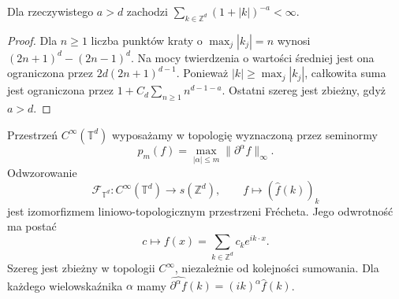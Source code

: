 \begin{lemat}
\label{lem:dt-lattice-summability}
Dla rzeczywistego $a>d$ zachodzi
$\sum_{k\in\mathbb Z^d}(1+|k|)^{-a}<\infty$.
\end{lemat}
\begin{proof}
Dla $n\ge1$ liczba punktów kraty o
$\max_j|k_j|=n$ wynosi
$(2n+1)^d-(2n-1)^d$.
Na mocy twierdzenia o wartości średniej
jest ona ograniczona przez $2d(2n+1)^{d-1}$.
Ponieważ $|k|\ge\max_j|k_j|$, całkowita
suma jest ograniczona przez
$1+C_d\sum_{n\ge1}n^{d-1-a}$.
Ostatni szereg jest zbieżny, gdyż $a>d$.
\end{proof}

\begin{twierdzenie}
\label{thm:dt-smooth-torus-fourier}
Przestrzeń $C^\infty(\mathbb T^d)$ wyposażamy
w topologię wyznaczoną przez seminormy
\[
 p_m(f)=\max_{|\alpha|\le m}\|\partial^\alpha f\|_\infty.
\]
Odwzorowanie
\[
 \mathcal F_{\mathbb T^d}: C^\infty(\mathbb T^d)
 \longrightarrow s(\mathbb Z^d),\qquad
 f\longmapsto(\widehat f(k))_k
\]
jest izomorfizmem liniowo-topologicznym przestrzeni
Frécheta. Jego odwrotność ma postać
\[
 c\longmapsto f(x)=\sum_{k\in\mathbb Z^d}c_ke^{ik\cdot x}.
\]
Szereg jest zbieżny w topologii $C^\infty$,
niezależnie od kolejności sumowania.
Dla każdego wielowskaźnika $\alpha$ mamy
$\widehat{\partial^\alpha f}(k)=(ik)^\alpha\widehat f(k)$.
\end{twierdzenie}
